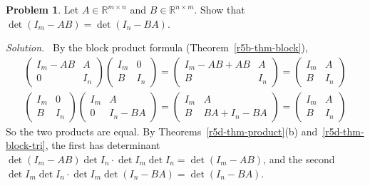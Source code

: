\documentclass[12pt]{article}
\newcommand{\R}{\mathbb R}
\theoremstyle{definition}
\newtheorem{problem}{Problem}
\newenvironment{solution}{\par\noindent\textit{Solution.}\ }{\par\smallskip}
\begin{document}
\begin{problem}\label{r5d-ex-sylvester}
Let \(A\in\R^{m\times n}\) and \(B\in\R^{n\times m}\). Show that \(\det(I_m-AB)=\det(I_n-BA)\).
\end{problem}
\begin{solution}
By the block product formula (Theorem~\ref{r5b-thm-block}),
\[
\begin{gathered}
\begin{pmatrix}I_m-AB&A\\0&I_n\end{pmatrix}\begin{pmatrix}I_m&0\\B&I_n\end{pmatrix}
=\begin{pmatrix}I_m-AB+AB&A\\B&I_n\end{pmatrix}=\begin{pmatrix}I_m&A\\B&I_n\end{pmatrix}\\
\begin{pmatrix}I_m&0\\B&I_n\end{pmatrix}\begin{pmatrix}I_m&A\\0&I_n-BA\end{pmatrix}
=\begin{pmatrix}I_m&A\\B&BA+I_n-BA\end{pmatrix}=\begin{pmatrix}I_m&A\\B&I_n\end{pmatrix}
\end{gathered}
\]
So the two products are equal. By Theorems~\ref{r5d-thm-product}(b) and~\ref{r5d-thm-block-tri}, the
first has determinant \(\det(I_m-AB)\det I_n\cdot\det I_m\det I_n=\det(I_m-AB)\), and the second
\(\det I_m\det I_n\cdot\det I_m\det(I_n-BA)=\det(I_n-BA)\).
\end{solution}
\end{document}
